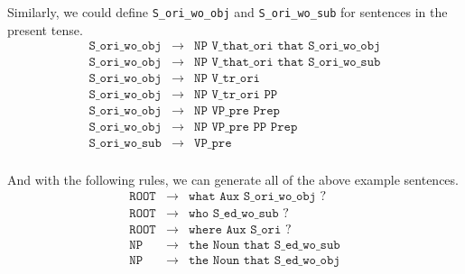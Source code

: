 \documentclass[11pt]{article}
\newcommand{\code}[1]{\texttt{#1}}
\begin{document}
\begin{enumerate}
Similarly, we could define \code{S\_ori\_wo\_obj} and \code{S\_ori\_wo\_sub} for sentences in the present tense.
\begin{eqnarray*}
\code{S\_ori\_wo\_obj} &\to&  \code{NP V\_that\_ori that S\_ori\_wo\_obj}\\
\code{S\_ori\_wo\_obj} &\to&  \code{NP V\_that\_ori that S\_ori\_wo\_sub}\\
\code{S\_ori\_wo\_obj} &\to&  \code{NP V\_tr\_ori}\\
\code{S\_ori\_wo\_obj} &\to&  \code{NP V\_tr\_ori PP}\\
\code{S\_ori\_wo\_obj} &\to&  \code{NP VP\_pre Prep}\\
\code{S\_ori\_wo\_obj} &\to&  \code{NP VP\_pre PP Prep}\\
\code{S\_ori\_wo\_sub} &\to&  \code{VP\_pre}\\
\end{eqnarray*}

And with the following rules, we can generate all of the above example sentences.
\begin{eqnarray*}
\code{ROOT} &\to&  \code{what Aux S\_ori\_wo\_obj ?}\\
\code{ROOT} &\to&  \code{who S\_ed\_wo\_sub ?}\\
\code{ROOT} &\to&  \code{where Aux S\_ori ?}\\
\code{NP}   &\to&  \code{the Noun that S\_ed\_wo\_sub}\\
\code{NP}   &\to&  \code{the Noun that S\_ed\_wo\_obj}\\
\end{eqnarray*}

\end{enumerate}
\end{document}
